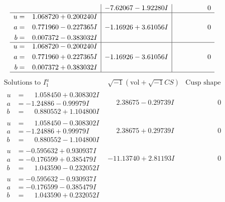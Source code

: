 \documentclass[1p]{elsarticle_modified}
\theoremstyle{definition}
\newcommand{\I}{\sqrt{-1}}
\begin{document}
$$\begin{array}{c|c|c}
 & -7.62067 - 1.92280 I & \phantom{-0.000000 } 0 \\ \hline\begin{aligned}
u &= \phantom{-}1.068720 + 0.200240 I \\
a &= \phantom{-}0.771960 - 0.227365 I \\
b &= \phantom{-}0.007372 - 0.383032 I\end{aligned}
 & -1.16926 + 3.61056 I & \phantom{-0.000000 } 0 \\ \hline\begin{aligned}
u &= \phantom{-}1.068720 - 0.200240 I \\
a &= \phantom{-}0.771960 + 0.227365 I \\
b &= \phantom{-}0.007372 + 0.383032 I\end{aligned}
 & -1.16926 - 3.61056 I & \phantom{-0.000000 } 0\\
 \hline 
 \end{array}$$\newpage$$\begin{array}{c|c|c}  
\text{Solutions to }I^u_{1}& \I (\text{vol} + \sqrt{-1}CS) & \text{Cusp shape}\\
 \hline 
\begin{aligned}
u &= \phantom{-}1.058450 + 0.308302 I \\
a &= -1.24886 - 0.99979 I \\
b &= \phantom{-}0.880552 + 1.104800 I\end{aligned}
 & \phantom{-}2.38675 - 0.29739 I & \phantom{-0.000000 } 0 \\ \hline\begin{aligned}
u &= \phantom{-}1.058450 - 0.308302 I \\
a &= -1.24886 + 0.99979 I \\
b &= \phantom{-}0.880552 - 1.104800 I\end{aligned}
 & \phantom{-}2.38675 + 0.29739 I & \phantom{-0.000000 } 0 \\ \hline\begin{aligned}
u &= -0.595632 + 0.930937 I \\
a &= -0.176599 + 0.385479 I \\
b &= \phantom{-}1.043590 - 0.232052 I\end{aligned}
 & -11.13740 + 2.81193 I & \phantom{-0.000000 } 0 \\ \hline\begin{aligned}
u &= -0.595632 - 0.930937 I \\
a &= -0.176599 - 0.385479 I \\
b &= \phantom{-}1.043590 + 0.232052 I\end{aligned}

\end{array}$$
\end{document}
